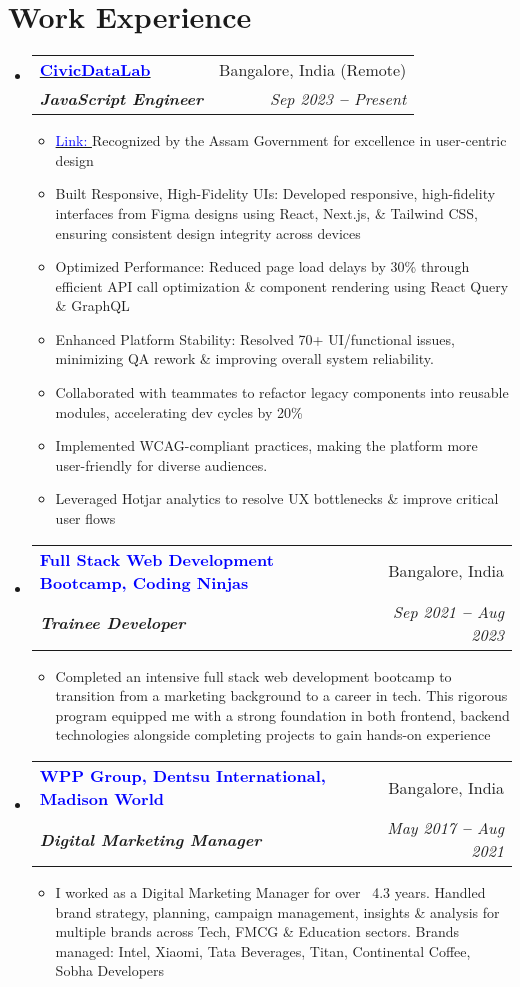 \documentclass[letterpaper,11pt]{article}
\makeatletter
\newcommand{\resumeItem}[1]{
  \item\footnotesize{
    {#1 \vspace{-2pt}}
  }
}
\newcommand{\resumeSubheading}[4]{
  \vspace{-2pt}\item
    \begin{tabular*}{0.97\textwidth}[t]{l@{\extracolsep{\fill}}r}
      \small\textbf{#1} & \footnotesize #2 \\
      \textit{\footnotesize#3} & \textit{\footnotesize #4} \\
    \end{tabular*}\vspace{-6pt}
}
\newcommand{\resumeSubHeadingListStart}{\begin{itemize}[leftmargin=0.15in, label={}]}
\newcommand{\resumeSubHeadingListEnd}{\end{itemize}}
\newcommand{\resumeItemListStart}{\begin{itemize}}
\newcommand{\resumeItemListEnd}{\end{itemize}\vspace{-10pt}}
\makeatother
\begin{document}

\section{Work Experience}
\vspace{1pt}
\resumeSubHeadingListStart
\resumeSubheading
{\href{https://civicdatalab.in}{\textcolor{blue}{CivicDataLab}}}{Bangalore, India (Remote)}
{\textbf{JavaScript Engineer}}{Sep 2023 \textbf{--} Present}

\resumeItemListStart
\resumeItem{ {\href{https://drr.open-contracting.in/en/}{\textcolor{blue}{Link: }}} Recognized by the Assam Government for excellence in user-centric design}
\resumeItem{Built Responsive, High-Fidelity UIs: Developed responsive, high-fidelity interfaces from Figma
designs using React, Next.js, \& Tailwind CSS, ensuring consistent design integrity across
devices}
\resumeItem{Optimized Performance: Reduced page load delays by 30\% through efficient API call
optimization \& component rendering using React Query \& GraphQL}
\resumeItem{Enhanced Platform Stability: Resolved 70+ UI/functional issues, minimizing QA rework \&
improving overall system reliability.}
\resumeItem{Collaborated with teammates to refactor legacy components into reusable modules, accelerating dev cycles by 20\%}
\resumeItem{Implemented WCAG-compliant practices, making the platform more user-friendly for diverse audiences.}
\resumeItem{Leveraged Hotjar analytics to resolve UX bottlenecks \& improve critical user flows}
\resumeItemListEnd

\vspace{6pt}
\resumeSubheading
{\textbf{\textcolor{blue}{Full Stack Web Development Bootcamp, Coding Ninjas}}}{Bangalore, India}
{\textbf{Trainee Developer}}{Sep 2021 \textbf{--} Aug 2023}

\resumeItemListStart
\resumeItem{Completed an intensive full stack web development bootcamp to transition from a marketing
background to a career in tech. This rigorous program equipped me with a strong foundation in
both frontend, backend technologies alongside completing projects to gain hands-on experience}

\resumeItemListEnd

\vspace{6pt}
\resumeSubheading
{\textcolor{blue}{WPP Group, Dentsu International, Madison World}}{Bangalore, India}
{\textbf{Digital Marketing Manager}}{May 2017 \textbf{--} Aug 2021}

\resumeItemListStart
\resumeItem{I worked as a Digital Marketing Manager for over ~4.3 years. Handled brand strategy, planning,
campaign management, insights \& analysis for multiple brands across Tech, FMCG \& Education
sectors. Brands managed: Intel, Xiaomi, Tata Beverages, Titan, Continental Coffee, Sobha
Developers
}
\resumeItemListEnd
\resumeSubHeadingListEnd
\end{document}
